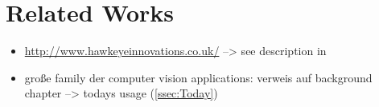 \chapter{Related Works}\label{c:relatedWorks}

\begin{itemize}
\item \url{http://www.hawkeyeinnovations.co.uk/} --> see description in \cite{Lowe.2016}
\item große family der computer vision applications: verweis auf background chapter --> todays usage (\autoref{ssec:Today})
\end{itemize}


